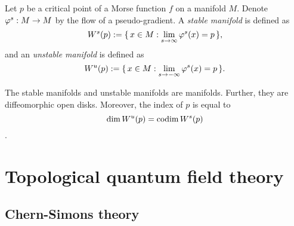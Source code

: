 \documentclass{../../large}
\begin{document}
\begin{defn}
Let $p$ be a critical point of a Morse function $f$ on a manifold $M$.
Denote $\varphi^s:M\to M$ by the flow of a pseudo-gradient.
A \emph{stable manifold} is defined as
\[W^s(p):=\{\,x\in M:\lim_{s\to\infty}\varphi^s(x)=p\,\},\]
and an \emph{unstable manifold} is defined as
\[W^u(p):=\{\,x\in M:\lim_{s\to-\infty}\varphi^s(x)=p\,\}.\]
\end{defn}
\begin{prop}
The stable manifolds and unstable manifolds are manifolds.
Further, they are diffeomorphic open disks.
Moreover, the index of $p$ is equal to
\[\dim W^u(p)=\operatorname{codim} W^s(p)\].
\end{prop}


\chapter{}
\chapter{}



\part{Topological quantum field theory}
\chapter{Chern-Simons theory}
\end{document}
